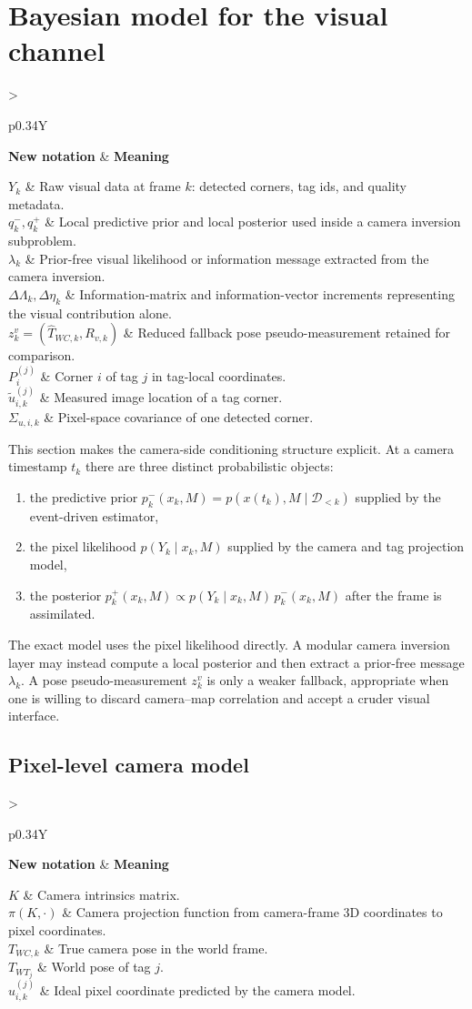 \documentclass[11pt]{report}
\newcommand{\NotationTable}[1]{%
\vspace{0.6mm}
{\scriptsize
\setlength{\tabcolsep}{2.5pt}
\begin{tabularx}{\columnwidth}{>{\raggedright\arraybackslash}p{0.34\columnwidth}Y}
\toprule
\textbf{New notation} & \textbf{Meaning}\\
\midrule
#1\\
\bottomrule
\end{tabularx}}
\vspace{0.8mm}}
\begin{document}
\section{Bayesian model for the visual channel}
\NotationTable{
$Y_k$ & Raw visual data at frame $k$: detected corners, tag ids, and quality metadata.\\
$q^-_k,q^+_k$ & Local predictive prior and local posterior used inside a camera inversion subproblem.\\
$\lambda_k$ & Prior-free visual likelihood or information message extracted from the camera inversion.\\
$\Delta\Lambda_k,\Delta\eta_k$ & Information-matrix and information-vector increments representing the visual contribution alone.\\
$z_k^v=(\widehat T_{WC,k},R_{v,k})$ & Reduced fallback pose pseudo-measurement retained for comparison.\\
$P_i^{(j)}$ & Corner $i$ of tag $j$ in tag-local coordinates.\\
$\widetilde u_{i,k}^{(j)}$ & Measured image location of a tag corner.\\
$\Sigma_{u,i,k}$ & Pixel-space covariance of one detected corner.}

This section makes the camera-side conditioning structure explicit. At a camera timestamp $t_k$ there are three distinct probabilistic objects:
\begin{enumerate}
  \item the predictive prior $p^-_k(x_k,M)=p(x(t_k),M\mid\mathcal D_{<k})$ supplied by the event-driven estimator,
  \item the pixel likelihood $p(Y_k\mid x_k,M)$ supplied by the camera and tag projection model,
  \item the posterior $p^+_k(x_k,M)\propto p(Y_k\mid x_k,M)\,p^-_k(x_k,M)$ after the frame is assimilated.
\end{enumerate}
The exact model uses the pixel likelihood directly. A modular camera inversion layer may instead compute a local posterior and then extract a prior-free message $\lambda_k$. A pose pseudo-measurement $z_k^v$ is only a weaker fallback, appropriate when one is willing to discard camera--map correlation and accept a cruder visual interface.

\subsection{Pixel-level camera model}
\NotationTable{
$K$ & Camera intrinsics matrix.\\
$\pi(K,\cdot)$ & Camera projection function from camera-frame 3D coordinates to pixel coordinates.\\
$T_{WC,k}$ & True camera pose in the world frame.\\
$T_{WT_j}$ & World pose of tag $j$.\\
$u_{i,k}^{(j)}$ & Ideal pixel coordinate predicted by the camera model.}
\end{document}
